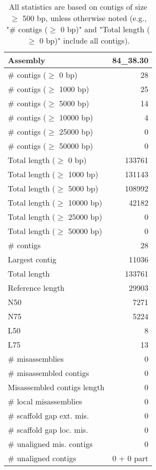 \documentclass[12pt,a4paper]{article}
\begin{document}
\begin{table}[ht]
\begin{center}
\caption{All statistics are based on contigs of size $\geq$ 500 bp, unless otherwise noted (e.g., "\# contigs ($\geq$ 0 bp)" and "Total length ($\geq$ 0 bp)" include all contigs).}
\begin{tabular}{|l*{1}{|r}|}
\hline
Assembly & 84\_38.30 \\ \hline
\# contigs ($\geq$ 0 bp) & 28 \\ \hline
\# contigs ($\geq$ 1000 bp) & 25 \\ \hline
\# contigs ($\geq$ 5000 bp) & 14 \\ \hline
\# contigs ($\geq$ 10000 bp) & 4 \\ \hline
\# contigs ($\geq$ 25000 bp) & 0 \\ \hline
\# contigs ($\geq$ 50000 bp) & 0 \\ \hline
Total length ($\geq$ 0 bp) & 133761 \\ \hline
Total length ($\geq$ 1000 bp) & 131143 \\ \hline
Total length ($\geq$ 5000 bp) & 108992 \\ \hline
Total length ($\geq$ 10000 bp) & 42182 \\ \hline
Total length ($\geq$ 25000 bp) & 0 \\ \hline
Total length ($\geq$ 50000 bp) & 0 \\ \hline
\# contigs & 28 \\ \hline
Largest contig & 11036 \\ \hline
Total length & 133761 \\ \hline
Reference length & 29903 \\ \hline
N50 & 7271 \\ \hline
N75 & 5224 \\ \hline
L50 & 8 \\ \hline
L75 & 13 \\ \hline
\# misassemblies & 0 \\ \hline
\# misassembled contigs & 0 \\ \hline
Misassembled contigs length & 0 \\ \hline
\# local misassemblies & 0 \\ \hline
\# scaffold gap ext. mis. & 0 \\ \hline
\# scaffold gap loc. mis. & 0 \\ \hline
\# unaligned mis. contigs & 0 \\ \hline
\# unaligned contigs & 0 + 0 part \\ \hline

\end{tabular}
\end{center}
\end{table}
\end{document}
